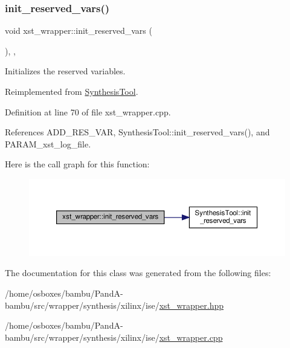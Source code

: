 \subsubsection{\texorpdfstring{init\+\_\+reserved\+\_\+vars()}{init\_reserved\_vars()}}
{\footnotesize\ttfamily void xst\+\_\+wrapper\+::init\+\_\+reserved\+\_\+vars (\begin{DoxyParamCaption}{ }\end{DoxyParamCaption})\hspace{0.3cm}{\ttfamily [override]}, {\ttfamily [protected]}, {\ttfamily [virtual]}}



Initializes the reserved variables. 



Reimplemented from \hyperlink{classSynthesisTool_a85b4a4fa0cc60e5325a79d7479c505b7}{Synthesis\+Tool}.



Definition at line 70 of file xst\+\_\+wrapper.\+cpp.



References A\+D\+D\+\_\+\+R\+E\+S\+\_\+\+V\+AR, Synthesis\+Tool\+::init\+\_\+reserved\+\_\+vars(), and P\+A\+R\+A\+M\+\_\+xst\+\_\+log\+\_\+file.

Here is the call graph for this function\+:
\nopagebreak
\begin{figure}[H]
\begin{center}
\leavevmode
\includegraphics[width=350pt]{d8/dd6/classxst__wrapper_a31f5b1a54ab117aaf0c0657854801fa4_cgraph}
\end{center}
\end{figure}


The documentation for this class was generated from the following files\+:\begin{DoxyCompactItemize}
\item 
/home/osboxes/bambu/\+Pand\+A-\/bambu/src/wrapper/synthesis/xilinx/ise/\hyperlink{xst__wrapper_8hpp}{xst\+\_\+wrapper.\+hpp}\item 
/home/osboxes/bambu/\+Pand\+A-\/bambu/src/wrapper/synthesis/xilinx/ise/\hyperlink{xst__wrapper_8cpp}{xst\+\_\+wrapper.\+cpp}\end{DoxyCompactItemize}
